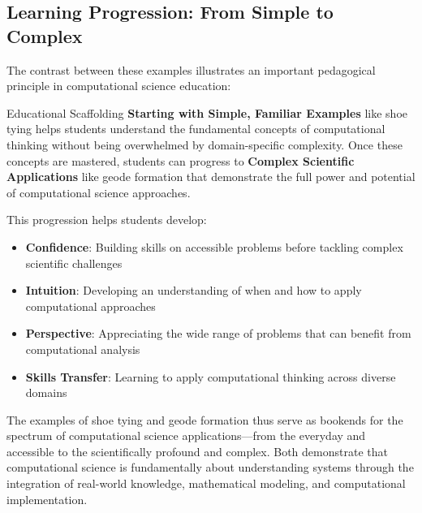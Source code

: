 \subsection{Learning Progression: From Simple to Complex}

The contrast between these examples illustrates an important pedagogical principle in computational science education:

\begin{highlightbox}{Educational Scaffolding}
\textbf{Starting with Simple, Familiar Examples} like shoe tying helps students understand the fundamental concepts of computational thinking without being overwhelmed by domain-specific complexity. Once these concepts are mastered, students can progress to \textbf{Complex Scientific Applications} like geode formation that demonstrate the full power and potential of computational science approaches.
\end{highlightbox}

This progression helps students develop:
\begin{itemize}
    \item \textbf{Confidence}: Building skills on accessible problems before tackling complex scientific challenges
    \item \textbf{Intuition}: Developing an understanding of when and how to apply computational approaches
    \item \textbf{Perspective}: Appreciating the wide range of problems that can benefit from computational analysis
    \item \textbf{Skills Transfer}: Learning to apply computational thinking across diverse domains
\end{itemize}

The examples of shoe tying and geode formation thus serve as bookends for the spectrum of computational science applications—from the everyday and accessible to the scientifically profound and complex. Both demonstrate that computational science is fundamentally about understanding systems through the integration of real-world knowledge, mathematical modeling, and computational implementation.


